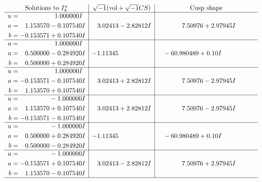 \documentclass[1p]{elsarticle_modified}
\theoremstyle{definition}
\newcommand{\I}{\sqrt{-1}}
\begin{document}
$$\begin{array}{c|c|c}  
\text{Solutions to }I^u_{4}& \I (\text{vol} + \sqrt{-1}CS) & \text{Cusp shape}\\
 \hline 
\begin{aligned}
u &= \phantom{-0.000000 -}1.000000 I \\
a &= \phantom{-}1.153570 - 0.107540 I \\
b &= -0.153571 + 0.107540 I\end{aligned}
 & \phantom{-}3.02413 - 2.82812 I & \phantom{-}7.50976 + 2.97945 I \\ \hline\begin{aligned}
u &= \phantom{-0.000000 -}1.000000 I \\
a &= \phantom{-}0.500000 - 0.284920 I \\
b &= \phantom{-}0.500000 + 0.284920 I\end{aligned}
 & -1.11345\phantom{ +0.000000I} & \phantom{-}                -6
0.980489 + 0. 10   I\phantom{ +0.000000I} \\ \hline\begin{aligned}
u &= \phantom{-0.000000 -}1.000000 I \\
a &= -0.153571 - 0.107540 I \\
b &= \phantom{-}1.153570 + 0.107540 I\end{aligned}
 & \phantom{-}3.02413 + 2.82812 I & \phantom{-}7.50976 - 2.97945 I \\ \hline\begin{aligned}
u &= \phantom{-0.000000 } -1.000000 I \\
a &= \phantom{-}1.153570 + 0.107540 I \\
b &= -0.153571 - 0.107540 I\end{aligned}
 & \phantom{-}3.02413 + 2.82812 I & \phantom{-}7.50976 - 2.97945 I \\ \hline\begin{aligned}
u &= \phantom{-0.000000 } -1.000000 I \\
a &= \phantom{-}0.500000 + 0.284920 I \\
b &= \phantom{-}0.500000 - 0.284920 I\end{aligned}
 & -1.11345\phantom{ +0.000000I} & \phantom{-}                -6
0.980489 + 0. 10   I\phantom{ +0.000000I} \\ \hline\begin{aligned}
u &= \phantom{-0.000000 } -1.000000 I \\
a &= -0.153571 + 0.107540 I \\
b &= \phantom{-}1.153570 - 0.107540 I\end{aligned}
 & \phantom{-}3.02413 - 2.82812 I & \phantom{-}7.50976 + 2.97945 I\\
 \hline 
 \end{array}$$\newpage\newpage\renewcommand{\arraystretch}{1}
\end{document}
